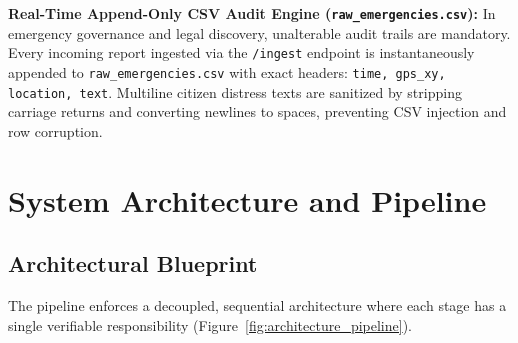 \documentclass[10pt,a4paper]{article}
\begin{document}
\textbf{Real-Time Append-Only CSV Audit Engine (\texttt{raw\_emergencies.csv}):} In emergency governance and legal discovery, unalterable audit trails are mandatory. Every incoming report ingested via the \texttt{/ingest} endpoint is instantaneously appended to \texttt{raw\_emergencies.csv} with exact headers: \texttt{time, gps\_xy, location, text}. Multiline citizen distress texts are sanitized by stripping carriage returns and converting newlines to spaces, preventing CSV injection and row corruption.

\section{System Architecture and Pipeline}
\subsection{Architectural Blueprint}
The pipeline enforces a decoupled, sequential architecture where each stage has a single verifiable responsibility (Figure~\ref{fig:architecture_pipeline}).
\end{document}
